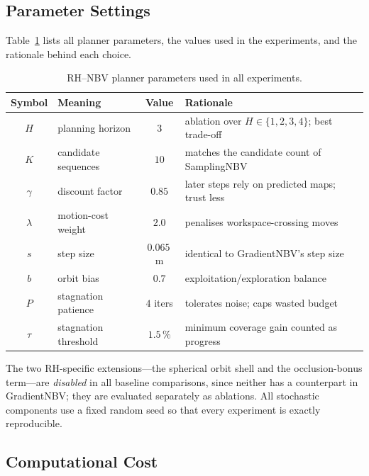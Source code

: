 \subsection{Parameter Settings}
\label{sec:alg-parameters}

Table~\ref{tab:rh-params} lists all planner parameters, the values used
in the experiments, and the rationale behind each choice.

\begin{table}[t]
  \centering
  \caption{RH--NBV planner parameters used in all experiments.}
  \label{tab:rh-params}
  \begin{tabular}{clcl}
    \toprule
    Symbol & Meaning & Value & Rationale \\
    \midrule
    $H$ & planning horizon & $3$ &
      ablation over $H \in \{1,2,3,4\}$; best trade-off \\
    $K$ & candidate sequences & $10$ &
      matches the candidate count of SamplingNBV \\
    $\gamma$ & discount factor & $0.85$ &
      later steps rely on predicted maps; trust less \\
    $\lambda$ & motion-cost weight & $2.0$ &
      penalises workspace-crossing moves \\
    $s$ & step size & $0.065$\,m &
      identical to GradientNBV's step size \\
    $b$ & orbit bias & $0.7$ &
      exploitation/exploration balance \\
    $P$ & stagnation patience & $4$ iters &
      tolerates noise; caps wasted budget \\
    $\tau$ & stagnation threshold & $1.5\,\%$ &
      minimum coverage gain counted as progress \\
    \bottomrule
  \end{tabular}
\end{table}

The two RH-specific extensions---the spherical orbit shell and the
occlusion-bonus term---are \emph{disabled} in all baseline comparisons,
since neither has a counterpart in GradientNBV; they are evaluated
separately as ablations. All stochastic components use a fixed random
seed so that every experiment is exactly reproducible.

\subsection{Computational Cost}
\label{sec:alg-complexity}


